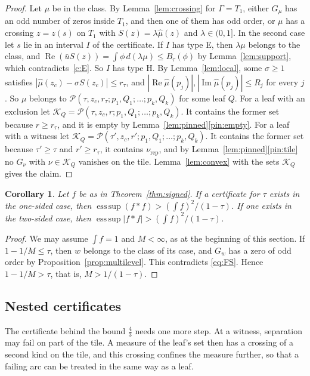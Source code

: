 \documentclass[11pt]{amsart}
\newtheorem{corollary}[theorem]{Corollary}
\theoremstyle{definition}
\theoremstyle{remark}
\numberwithin{equation}{section}
\newcommand{\re}{\operatorname{Re}}
\newcommand{\im}{\operatorname{Im}}
\newcommand{\esssup}{\operatorname*{ess\,sup}}
\begin{document}
\begin{proof}
Let $\mu$ be in the class. By Lemma~\ref{lem:crossing} for $\Gamma=T_1$, either $G_\mu$ has an odd number of zeros inside $T_1$, and then one of them has odd order, or $\mu$ has a crossing $z=z(s)$ on $T_1$ with $S(z)=\lambda\hat\mu(z)$ and $\lambda\in(0,1]$. In the second case let $s$ lie in an interval $I$ of the certificate. If $I$ has type E, then $\lambda\mu$ belongs to the class, and $\re(\bar uS(z))=\int\phi\,d(\lambda\mu)\le B_\tau(\phi)$ by Lemma~\ref{lem:support}, which contradicts~\ref{c:E}. So $I$ has type H. By Lemma~\ref{lem:local}, some $\sigma\ge1$ satisfies $|\hat\mu(z_c)-\sigma S(z_c)|\le r_\tau$, and $|\re\hat\mu(p_j)|,|\im\hat\mu(p_j)|\le R_j$ for every $j$. So $\mu$ belongs to $\mathcal P(\tau,z_c,r_\tau;p_1,Q_1;\dots;p_k,Q_k)$ for some leaf $Q$. For a leaf with an exclusion let $\mathcal K_Q=\mathcal P(\tau,z_c,r;p_1,Q_1;\dots;p_k,Q_k)$. It contains the former set because $r\ge r_\tau$, and it is empty by Lemma~\ref{lem:pinned}\ref{pin:empty}. For a leaf with a witness let $\mathcal K_Q=\mathcal P(\tau',z_c,r';p_1,Q_1;\dots;p_k,Q_k)$. It contains the former set because $\tau'\ge\tau$ and $r'\ge r_\tau$, it contains $\nu_{\mathrm{rep}}$, and by Lemma~\ref{lem:pinned}\ref{pin:tile} no $G_\nu$ with $\nu\in\mathcal K_Q$ vanishes on the tile. Lemma~\ref{lem:convex} with the sets $\mathcal K_Q$ gives the claim.
\end{proof}

\begin{corollary}\label{cor:cert}
Let $f$ be as in Theorem~\ref{thm:signed}. If a certificate for $\tau$ exists in the one-sided case, then $\esssup(f*f)>(\int f)^2/(1-\tau)$. If one exists in the two-sided case, then $\esssup|f*f|>(\int f)^2/(1-\tau)$.
\end{corollary}

\begin{proof}
We may assume $\int f=1$ and $M<\infty$, as at the beginning of this section. If $1-1/M\le\tau$, then $w$ belongs to the class of its case, and $G_w$ has a zero of odd order by Proposition~\ref{prop:multilevel}. This contradicts \eqref{eq:FS}. Hence $1-1/M>\tau$, that is, $M>1/(1-\tau)$.
\end{proof}

\subsection*{Nested certificates}
The certificate behind the bound $\tfrac43$ needs one more step. At a witness, separation may fail on part of the tile. A measure of the leaf's set then has a crossing of a second kind on the tile, and this crossing confines the measure further, so that a failing arc can be treated in the same way as a leaf.
\end{document}
